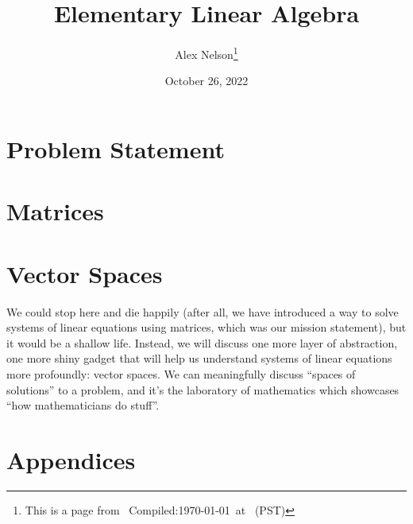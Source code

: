 \documentclass{article}
\title{Elementary Linear Algebra}
\author{Alex Nelson\thanks{This is a page from \homeurl{}\hfil\break\indent\;\, Compiled:\enspace\today\ at \currenttime\ (PST)}}
\date{October 26, 2022}
\begin{document}
\maketitle
\tableofcontents

\part{Problem Statement}

\part{Matrices}




% 

\vfill\eject
\part{Vector Spaces}

We could stop here and die happily (after all, we have introduced a way
to solve systems of linear equations using matrices, which was our
mission statement), but it would be a shallow
life. Instead, we will discuss one more layer of abstraction, one more
shiny gadget that will help us understand systems of linear equations
more profoundly: vector spaces. We can meaningfully discuss ``spaces of
solutions'' to a problem, and it's the laboratory of mathematics which
showcases ``how mathematicians do stuff''.






\vfill\eject
\part{Appendices}
\appendix
%
\vfill\eject

\end{document}
